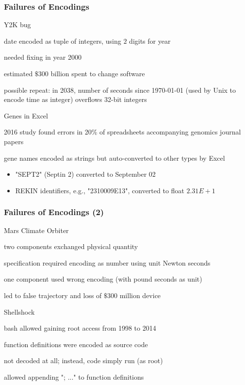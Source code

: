 \documentclass{beamer}
\begin{document}
\begin{frame}\frametitle{Failures of Encodings}
\begin{blockitems}{Y2K bug}
\item date encoded as tuple of integers, using $2$ digits for year
\item needed fixing in year 2000
\item estimated $\$300$ billion spent to change software
\item possible repeat: in 2038, number of seconds since 1970-01-01 (used by Unix to encode time as integer) overflows 32-bit integers
\end{blockitems}

\begin{blockitems}{Genes in Excel}
 \item 2016 study found errors in 20\% of spreadsheets accompanying genomics journal papers
 \item gene names encoded as strings but auto-converted to other types by Excel
 \begin{itemize}
 \item "SEPT2" (Septin 2) converted to September 02
 \item REKIN identifiers, e.g., "2310009E13", converted to float $2.31E+1$
 \end{itemize}
\end{blockitems}
\end{frame}

\begin{frame}\frametitle{Failures of Encodings (2)}
\begin{blockitems}{Mars Climate Orbiter}
\item two components exchanged physical quantity
\item specification required encoding as number using unit Newton seconds
\item one component used wrong encoding (with pound seconds as unit)
\item led to false trajectory and loss of $\$300$ million device
\end{blockitems}

\begin{blockitems}{Shellshock}
\item bash allowed gaining root access from 1998 to 2014
\item function definitions were encoded as source code
\item not decoded at all; instead, code simply run (as root)
\item allowed appending "; ..." to function definitions
\end{blockitems}

\end{frame}
\end{document}

